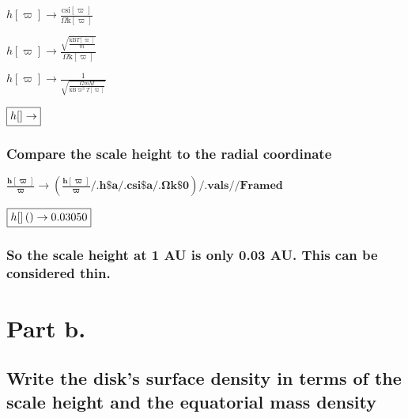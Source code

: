 \documentclass{article}
\begin{document}
\begin{doublespace}
\noindent\(h[\varpi ]\to \frac{\text{csi}[\varpi ]}{\text{$\Omega $k}[\varpi ]}\)
\end{doublespace}

\begin{doublespace}
\noindent\(h[\varpi ]\to \frac{\sqrt{\frac{\text{kB} T[\varpi ]}{m}}}{\text{$\Omega $k}[\varpi ]}\)
\end{doublespace}

\begin{doublespace}
\noindent\(h[\varpi ]\to \frac{1}{\sqrt{\frac{G m M}{\text{kB} \varpi ^3 T[\varpi ]}}}\)
\end{doublespace}

\begin{doublespace}
\noindent\(\fbox{$h[]\to $}\)
\end{doublespace}

\subsubsection*{Compare the scale height to the radial coordinate}

\begin{doublespace}
\noindent\(\pmb{\frac{h[\varpi ]}{\varpi }\to  \left(\frac{h[\varpi ]}{\varpi }\text{/.} \text{h$\$$a}\text{/.} \text{csi$\$$a}\text{/.} \text{$\Omega
$k$\$$0}\right) \text{/.} \text{vals} \text{//}\text{Framed}}\)
\end{doublespace}

\begin{doublespace}
\noindent\(\fbox{$h[] \left(\right)\to 0.03050$}\)
\end{doublespace}

\subsubsection*{So the scale height at 1 AU is only 0.03 AU. This can be considered thin.}

\section*{Part b.}

\subsection*{Write the disk{'}s surface density in terms of the scale height and the equatorial mass density}
\end{document}
